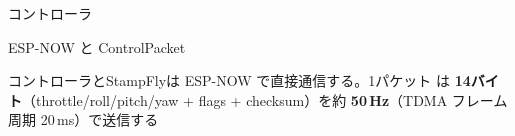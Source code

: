 \begin{frame}{コントローラ}
  \begin{center}
  \end{center}
\end{frame}

\begin{frame}{ESP-NOW と ControlPacket}
  \begin{center}
  \end{center}

  \vspace{0.3em}

  {\small コントローラとStampFlyは ESP-NOW で直接通信する。1パケット  は \textbf{14バイト}（throttle/roll/pitch/yaw + flags + checksum）を約 \textbf{50\,Hz}（TDMA フレーム周期 20\,ms）で送信する}
\end{frame}

